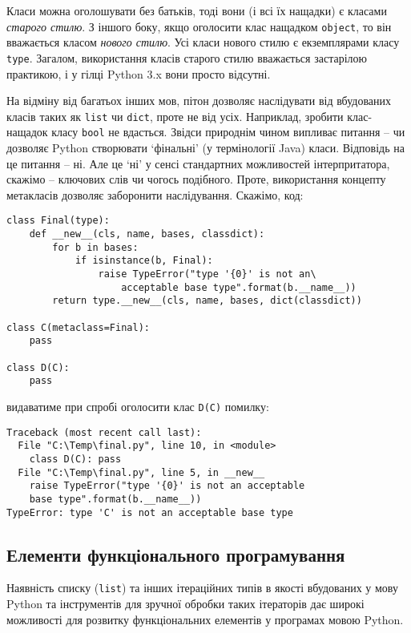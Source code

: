 \documentclass[a4paper, 12pt, onsedie]{article}
\begin{document}
Класи можна оголошувати без батьків, тоді вони (і всі їх нащадки) є класами 
\emph{старого стилю}. З іншого боку, якщо оголосити клас нащадком \texttt{object}, то він 
вважається класом \emph{нового стилю}. Усі класи нового стилю є екземплярами класу 
\texttt{type}. Загалом, використання класів старого стилю вважається застарілою практикою,
і у гілці Python 3.x вони просто відсутні.  

На відміну від багатьох інших мов, пітон дозволяє наслідувати від вбудованих класів таких 
як \texttt{list} чи \texttt{dict}, проте не від усіх. Наприклад, зробити клас-нащадок класу
\texttt{bool} не вдасться. Звідси природнім чином випливає питання -- чи дозволяє Python
створювати `фінальні' (у термінології Java) класи. Відповідь на це питання -- ні. Але це
`ні' у сенсі стандартних можливостей інтерпритатора, скажімо -- ключових слів чи чогось
подібного. Проте, використання концепту метакласів дозволяє заборонити наслідування.
Скажімо, код:

\begin{verbatim}
class Final(type):
    def __new__(cls, name, bases, classdict):
        for b in bases:
            if isinstance(b, Final):
                raise TypeError("type '{0}' is not an\
                    acceptable base type".format(b.__name__))
        return type.__new__(cls, name, bases, dict(classdict))

class C(metaclass=Final): 
    pass

class D(C): 
    pass
\end{verbatim}
видаватиме при спробі оголосити клас \texttt{D(C)} помилку:

\begin{verbatim}
Traceback (most recent call last):
  File "C:\Temp\final.py", line 10, in <module>
    class D(C): pass
  File "C:\Temp\final.py", line 5, in __new__
    raise TypeError("type '{0}' is not an acceptable 
    base type".format(b.__name__))
TypeError: type 'C' is not an acceptable base type
\end{verbatim}

\subsection{Елементи функціонального програмування}
Наявність списку (\texttt{list}) та інших ітераційних типів в якості вбудованих
у мову Python та інструментів для зручної обробки таких ітераторів дає широкі можливості
для розвитку функціональних елементів у програмах мовою Python.
\end{document}
